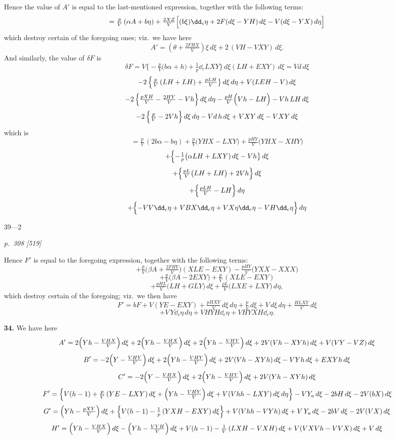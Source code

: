 \documentclass[11pt,a4paper]{book}
\begin{document}
Hence the value of $A'$ is equal to the last-mentioned expression, together with the following terms:
\[
= \tfrac{p}{V}\,(\alpha A + b\eta) + \tfrac{2 X Z}{V}\Bigl[(b\xi)\dd_{c}\eta + 2 F(d\xi - YH)\,d\xi - V(d\xi - YX)\,d\eta\Bigr]
\]
which destroy certain of the foregoing ones; viz.\ we have here
\[
A' = (\theta + \tfrac{2 F H X}{V})\xi\,d\xi + 2\,(VH - V XY)\,d\xi.
\]
And similarly, the value of $\delta F$ is
\[
\delta F = V\bigl\{-\tfrac{p}{V}\bigl(b\alpha + h\bigr) + \tfrac{1}{p}\dd_{c}LXY\bigr\}\,d\xi(LH + EXY)\,d\xi = V d\,d\xi
\]
\[
- 2\,\Bigl\{\tfrac{p}{V}\,(LH + LH) + \tfrac{p L H}{V}\bigr\}\,d\xi\,d\eta + V(LE H - V)\,d\xi
\]
\[
- 2\,\Bigl\{\tfrac{p X H}{V} - \tfrac{2 H Y}{V} - V h\Bigr\}\,d\xi\,d\eta - \tfrac{p H}{V}\Bigl(V h - LH\Bigr) - V h\,LH\,d\xi
\]
\[
- 2\,\Bigl\{\tfrac{p}{V} - 2 V h\Bigr\}\,d\xi\,d\eta - V d\,h\,d\xi + V XY\,d\xi - V XY\,d\xi
\]
which is
\[
= \tfrac{p}{V}\,(2 b\alpha - b\eta) + \tfrac{p}{V}\bigl(YHX - LXY\bigr) + \tfrac{p H Y}{V}\bigl(YHX - XHY\bigr)
\]
\[
+ \Bigl\{-\tfrac{1}{p}\bigl(\alpha LH + LXY)\,d\xi - V h\bigr\}\,d\xi
\]
\[
+ \Bigl\{\tfrac{p L}{V}\bigl(LH + LH\bigr) + 2 V h\Bigr\}\,d\xi
\]
\[
+ \Bigl\{\tfrac{p L H}{V} - L H\Bigr\}\,d\eta
\]
\[
+ \Bigl\{-V V\dd_{c}\eta + V B X\dd_{c}\eta + V X\eta\dd_{c}\eta - V H\dd_{c}\eta\Bigr\}\,d\eta
\]

\hfill 39---2

\clearpage

\bigskip
\textit{p.~308 [519]}
\smallskip

\noindent
Hence $F'$ is equal to the foregoing expression, together with the following terms:
\[
+ \tfrac{p}{V}\bigl(\beta A + \tfrac{2 F H Y}{V}\bigr)(XLE - EXY) - \tfrac{p H Y}{V}\bigl(YXX - XXX\bigr)
\]
\[
+ \tfrac{p}{V}\bigl(\beta A - 2EXY\bigr) + \tfrac{p}{V}\,(XLE - EXY)
\]
\[
+ \tfrac{p H L}{V}\bigl(LH + GLY\bigr)\,d\xi + \tfrac{p L}{V}\bigl(LX E + LX Y\bigr)\,d\eta,
\]
which destroy certain of the foregoing; viz.\ we then have
\[
F' = b F + V(YE - EXY) + \tfrac{p H X Y}{V}\,d\xi\,d\eta + \tfrac{p}{V}\,d\xi + V\,d\xi\,d\eta + \tfrac{H L X Y}{V}\,d\xi
\]
\[
+ V\,Y\dd_{c}\eta\,d\eta + V H Y H\dd_{c}\eta + V H Y X H\dd_{c}\eta.
\]

\textbf{34.} We have here
\[
A' = 2\Bigl(Y h - \tfrac{V H X}{V}\Bigr)\,d\xi + 2\Bigl(Y h - \tfrac{V H X}{V}\Bigr)\,d\xi + 2\Bigl(Y h - \tfrac{V H Y}{V}\Bigr)\,d\xi + 2 V (V h - XY h)\,d\xi + V (V Y - V Z)\,d\xi
\]
\[
B' = -2\Bigl(Y - \tfrac{V H Y}{V}\Bigr)\,d\xi + 2\Bigl(Y h - \tfrac{V H Y}{V}\Bigr)\,d\xi + 2 V (V h - XY h)\,d\xi - VY h\,d\xi + EXY h\,d\xi
\]
\[
C' = -2\Bigl(Y - \tfrac{V H X}{V}\Bigr)\,d\xi + 2\Bigl(Y h - \tfrac{V H Y}{V}\Bigr)\,d\xi + 2 V (Y h - XY h)\,d\xi
\]
\[
F' = \Bigl\{V (h - 1) + \tfrac{p}{V}\,(YE - LXY)\,d\xi + \Bigl(Y h - \tfrac{V H Y}{V}\Bigr)\,d\xi + V (V h h - LXY)\,d\xi\,d\eta\Bigr\} - V Y_{a}\,d\xi - 2 b H\,d\xi - 2 V (b X)\,d\xi
\]
\[
G' = \Bigl(Y h - \tfrac{p X Y}{V}\Bigr)\,d\xi + \Bigl\{V (h - 1) - \tfrac{1}{p}\,(YXH - EXY)\,d\xi\Bigr\} + V (V h h - V Y h)\,d\xi + V \,Y_{a}\,d\xi - 2 b V\,d\xi - 2 V (V X)\,d\xi
\]
\[
H' = \Bigl(Y h - \tfrac{V H X}{V}\Bigr)\,d\xi - \Bigl(Y h - \tfrac{V Y H}{V}\Bigr)\,d\xi + V (h - 1) - \tfrac{1}{V}\,(LX H - V XH)\,d\xi + V (V X V h - V V X)\,d\xi + V \,d\xi
\]
\end{document}

